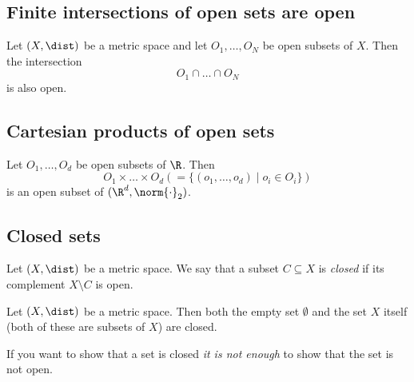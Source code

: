 \subsection*{Finite intersections of open sets are open}
\begin{proposition}
    Let $(X, \dist)$ be a metric space and let $O_1,\dots,O_N$ be open subsets of $X$. Then the intersection
    $$O_1 \cap \dots \cap O_N$$
    is also open.
\end{proposition}

\subsection*{Cartesian products of open sets}
\begin{proposition}
    Let $O_1,\dots,O_d$ be open subsets of $\R$. Then
    $$O_1 \times \dots \times O_d (=\{(o_1, \dots, o_d) \mid o_i \in O_i\})$$
    is an open subset of $(\R^d, \norm{\cdot}_2)$.
\end{proposition} 

\subsection{Closed sets}
\begin{definition}
    Let $(X, \dist)$ be a metric space. We say that a subset $C \subseteq X$ is \emph{closed} if its complement
    $X \setminus C$ is open.
\end{definition}

\begin{proposition}
    Let $(X, \dist)$ be a metric space. Then both the empty set $\emptyset$ and the set $X$ itself (both of these are subsets of $X$) are closed.
\end{proposition}
\begin{warning}
    If you want to show that a set is closed \emph{it is not enough} to show that the set is not open.
\end{warning}

